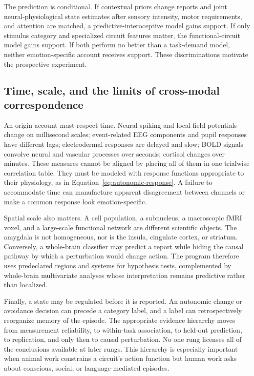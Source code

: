 \documentclass[conference]{IEEEtran}
\begin{document}
The prediction is conditional. If contextual priors change reports and joint neural-physiological state estimates after sensory intensity, motor requirements, and attention are matched, a predictive-interoceptive model gains support. If only stimulus category and specialized circuit features matter, the functional-circuit model gains support. If both perform no better than a task-demand model, neither emotion-specific account receives support. These discriminations motivate the prospective experiment.

\subsection{Time, scale, and the limits of cross-modal correspondence}

An origin account must respect time. Neural spiking and local field potentials change on millisecond scales; event-related EEG components and pupil responses have different lags; electrodermal responses are delayed and slow; BOLD signals convolve neural and vascular processes over seconds; cortisol changes over minutes. These measures cannot be aligned by placing all of them in one trialwise correlation table. They must be modeled with response functions appropriate to their physiology, as in Equation~\eqref{eq:autonomic-response}. A failure to accommodate time can manufacture apparent disagreement between channels or make a common response look emotion-specific.

Spatial scale also matters. A cell population, a subnucleus, a macroscopic fMRI voxel, and a large-scale functional network are different scientific objects. The amygdala is not homogeneous, nor is the insula, cingulate cortex, or striatum. Conversely, a whole-brain classifier may predict a report while hiding the causal pathway by which a perturbation would change action. The program therefore uses predeclared regions and systems for hypothesis tests, complemented by whole-brain multivariate analyses whose interpretation remains predictive rather than localized.

Finally, a state may be regulated before it is reported. An autonomic change or avoidance decision can precede a category label, and a label can retrospectively reorganize memory of the episode. The appropriate evidence hierarchy moves from measurement reliability, to within-task association, to held-out prediction, to replication, and only then to causal perturbation. No one rung licenses all of the conclusions available at later rungs. This hierarchy is especially important when animal work constrains a circuit's action function but human work asks about conscious, social, or language-mediated episodes.
\end{document}
